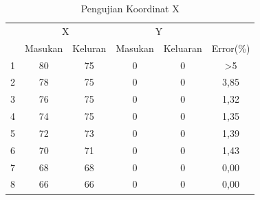 \begin{longtable}{|c|c|c|c|c|c|}
	
	\caption{Pengujian Koordinat X}
	\label{tbl.x}\\
	\hline
	
	
	\rowcolor[HTML]{656565} 
	\cellcolor[HTML]{656565}                     & \multicolumn{2}{c|}{\cellcolor[HTML]{656565}X} & \multicolumn{2}{c|}{\cellcolor[HTML]{656565}Y} & \cellcolor[HTML]{656565}                           \\ \cline{2-5}
	\rowcolor[HTML]{656565} 
	\multirow{-2}{*}{\cellcolor[HTML]{656565}No} & Masukan                & Keluran               & Masukan               & Keluaran               & \multirow{-2}{*}{\cellcolor[HTML]{656565}Error(\%)} \\ \hline
	\endfirsthead
	\endhead
	1                                            & 80                     & 75                    & 0                     & 0                      & >5                                               \\ \hline
	2                                            & 78                     & 75                    & 0                     & 0                      & 3,85                                               \\ \hline
	3                                            & 76                     & 75                    & 0                     & 0                      & 1,32                                               \\ \hline
	4                                            & 74                     & 75                    & 0                     & 0                      & 1,35                                               \\ \hline
	5                                            & 72                     & 73                    & 0                     & 0                      & 1,39                                               \\ \hline
	6                                            & 70                     & 71                    & 0                     & 0                      & 1,43                                               \\ \hline
	7                                            & 68                     & 68                    & 0                     & 0                      & 0,00                                               \\ \hline
	8                                            & 66                     & 66                    & 0                     & 0                      & 0,00                                               \\ \hline

\end{longtable}
